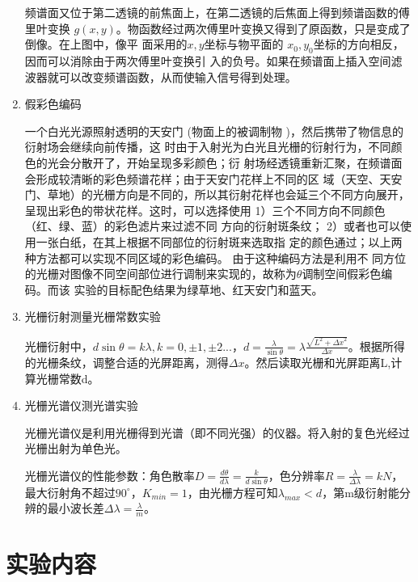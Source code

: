 \documentclass[11pt]{article}
\begin{document}
\begin{enumerate}
    频谱面又位于第二透镜的前焦面上，在第二透镜的后焦面上得到频谱函数的傅里叶变换
    $g(x, y)$。物函数经过两次傅里叶变换又得到了原函数，只是变成了倒像。在上图中，像平
    面采用的$x, y$坐标与物平面的 $x_0,y_0$坐标的方向相反，因而可以消除由于两次傅里叶变换引
    入的负号。如果在频谱面上插入空间滤波器就可以改变频谱函数，从而使输入信号得到处理。
    \item 假彩色编码
    \par \hspace*{2em}一个白光光源照射透明的天安门 (物面上的被调制物 )，然后携带了物信息的衍射场会继续向前传播，这
    时由于入射光为白光且光栅的衍射行为，不同颜色的光会分散开了，开始呈现多彩颜色；衍
    射场经透镜重新汇聚，在频谱面会形成较清晰的彩色频谱花样；由于天安门花样上不同的区
    域（天空、天安门、草地）的光栅方向是不同的，所以其衍射花样也会延三个不同方向展开，
    呈现出彩色的带状花样。这时，可以选择使用 1）三个不同方向不同颜色（红、绿、蓝）的彩色滤片来过滤不同
    方向的衍射斑条纹； 2）或者也可以使用一张白纸，在其上根据不同部位的衍射斑来选取指
    定的颜色通过；以上两种方法都可以实现不同区域的彩色编码。 由于这种编码方法是利用不
    同方位的光栅对图像不同空间部位进行调制来实现的，故称为$\theta$调制空间假彩色编码。而该
    实验的目标配色结果为绿草地、红天安门和蓝天。
    \item 光栅衍射测量光栅常数实验
    \par \hspace*{2em}光栅衍射中，$d\sin\theta=k\lambda,k=0,\pm1,\pm2...$，$d=\frac{\lambda}{\sin \theta}=\lambda\frac{\sqrt{L^2+{\Delta x}^2}}{\Delta x}$。根据所得的光栅条纹，调整合适的光屏距离，测得$\Delta x$。然后读取光栅和光屏距离L,计算光栅常数d。
    \item 光栅光谱仪测光谱实验
    \par \hspace*{2em}光栅光谱仪是利用光栅得到光谱（即不同光强）的仪器。将入射的复色光经过光栅出射为单色光。
    \par \hspace*{2em}光栅光谱仪的性能参数：角色散率$D=\frac{d\theta}{d\lambda}=\frac{k}{d\sin\theta}$，色分辨率$R=\frac{\lambda}{\Delta \lambda}=kN$，最大衍射角不超过$90^\circ$，$K_{min}=1$，由光栅方程可知$\lambda_{max}<d$，第m级衍射能分辨的最小波长差$\Delta \lambda=\frac{\lambda}{m}$。
\end{enumerate}


\section{实验内容}
\end{document}
